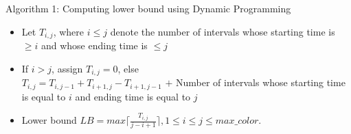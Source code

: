 \begin{frame}{Algorithm 1: Computing lower bound using Dynamic Programming}

\begin{itemize}

\item Let $T_{i,j}$, where $i \le j$ denote the number of intervals whose starting time is $\ge i$ and whose ending time is $\le j$ \;

\item If $i > j$, assign $T_{i,j}=0$, else \\
      $T_{i,j} = T_{i,j-1} + T_{i+1,j} - T_{i+1,j-1}$ $+$ Number of intervals whose starting time is equal to $i$ and ending time is 
      equal to $j$ \;
\item Lower bound $LB = max{\lceil \frac{T_{i,j}}{j-i+1}\rceil}, 1 \le i \le j \le max\_color $.
\end{itemize}

\end{frame}
